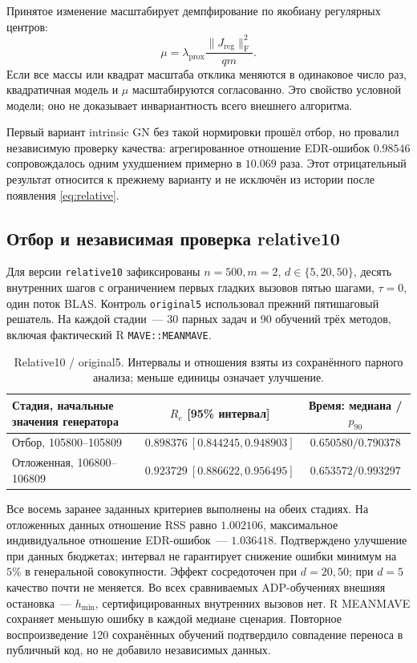 \documentclass[11pt,a4paper]{article}
\numberwithin{equation}{section}
\newcommand{\F}{_{\mathrm F}}
\newcommand{\file}[1]{\nolinkurl{#1}}
\begin{document}
Принятое изменение масштабирует демпфирование по якобиану регулярных
центров:
\begin{equation}\label{eq:relative}
 \mu=\lambda_{\mathrm{prox}}
         \frac{\|J_{\mathrm{reg}}\|\F^2}{qm}.
\end{equation}
Если все массы или квадрат масштаба отклика меняются в одинаковое число
раз, квадратичная модель и $\mu$ масштабируются согласованно.
Это свойство условной модели; оно не доказывает инвариантность всего
внешнего алгоритма.

Первый вариант intrinsic GN без такой нормировки прошёл отбор,
но провалил независимую проверку качества: агрегированное отношение
EDR-ошибок $0.98546$ сопровождалось одним ухудшением примерно
в $10.069$ раза. Этот отрицательный результат относится к прежнему
варианту и не исключён из истории после появления \eqref{eq:relative}.
\cite{accuracy18,relative}

\subsection{Отбор и независимая проверка relative10}

Для версии \file{relative10} зафиксированы $n=500,m=2$,
$d\in\{5,20,50\}$, десять внутренних шагов с ограничением первых
гладких вызовов пятью шагами, $\tau=0$, один поток BLAS.
Контроль \file{original5} использовал прежний пятишаговый решатель.
На каждой стадии~--- 30 парных задач и 90 обучений трёх методов,
включая фактический R \file{MAVE::MEANMAVE}.

\begin{table}[htbp]
\centering\small
\caption{Relative10 / original5. Интервалы и отношения взяты
из сохранённого парного анализа; меньше единицы означает улучшение.}
\label{tab:relative}
\begin{tabularx}{\linewidth}{@{}Xcc@{}}
\toprule
Стадия, начальные значения генератора & $R_e$ [95\% интервал]
 & Время: медиана / $p_{90}$\\
\midrule
Отбор, 105800--105809 & $0.898376\ [0.844245,0.948903]$ & $0.650580/0.790378$\\
Отложенная, 106800--106809 & $0.923729\ [0.886622,0.956495]$ & $0.653572/0.993297$\\
\bottomrule
\end{tabularx}
\end{table}

Все восемь заранее заданных критериев выполнены на обеих стадиях.
На отложенных данных отношение RSS равно $1.002106$,
максимальное индивидуальное отношение EDR-ошибок~--- $1.036418$.
Подтверждено улучшение при данных бюджетах; интервал не гарантирует
снижение ошибки минимум на $5\%$ в генеральной совокупности.
Эффект сосредоточен при $d=20,50$; при $d=5$ качество почти не меняется.
Во всех сравниваемых ADP-обучениях внешняя остановка~--- $h_{\min}$,
сертифицированных внутренних вызовов нет.
R MEANMAVE сохраняет меньшую ошибку в каждой медиане сценария.
Повторное воспроизведение 120 сохранённых обучений подтвердило
совпадение переноса в публичный код, но не добавило независимых данных.
\cite{relative}
\end{document}
